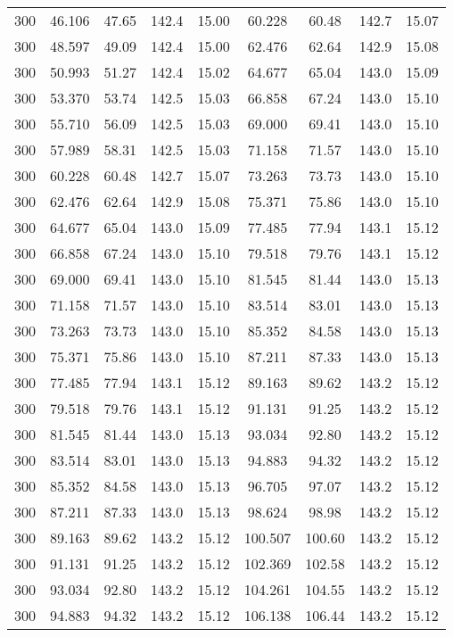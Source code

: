\documentclass[captions=tableheading]{scrartcl}
\begin{document}
\begin{table}
\begin{tabular}{c c c c c c c c c}
    300 &  46.106 &  47.65 & 142.4 & 15.00 &   60.228 &  60.48 & 142.7 & 15.07 \\
    300 &  48.597 &  49.09 & 142.4 & 15.00 &   62.476 &  62.64 & 142.9 & 15.08 \\
    300 &  50.993 &  51.27 & 142.4 & 15.02 &   64.677 &  65.04 & 143.0 & 15.09 \\
    300 &  53.370 &  53.74 & 142.5 & 15.03 &   66.858 &  67.24 & 143.0 & 15.10 \\
    300 &  55.710 &  56.09 & 142.5 & 15.03 &   69.000 &  69.41 & 143.0 & 15.10 \\
    300 &  57.989 &  58.31 & 142.5 & 15.03 &   71.158 &  71.57 & 143.0 & 15.10 \\
    300 &  60.228 &  60.48 & 142.7 & 15.07 &   73.263 &  73.73 & 143.0 & 15.10 \\
    300 &  62.476 &  62.64 & 142.9 & 15.08 &   75.371 &  75.86 & 143.0 & 15.10 \\
    300 &  64.677 &  65.04 & 143.0 & 15.09 &   77.485 &  77.94 & 143.1 & 15.12 \\
    300 &  66.858 &  67.24 & 143.0 & 15.10 &   79.518 &  79.76 & 143.1 & 15.12 \\
    300 &  69.000 &  69.41 & 143.0 & 15.10 &   81.545 &  81.44 & 143.0 & 15.13 \\
    300 &  71.158 &  71.57 & 143.0 & 15.10 &   83.514 &  83.01 & 143.0 & 15.13 \\
    300 &  73.263 &  73.73 & 143.0 & 15.10 &   85.352 &  84.58 & 143.0 & 15.13 \\
    300 &  75.371 &  75.86 & 143.0 & 15.10 &   87.211 &  87.33 & 143.0 & 15.13 \\
    300 &  77.485 &  77.94 & 143.1 & 15.12 &   89.163 &  89.62 & 143.2 & 15.12 \\
    300 &  79.518 &  79.76 & 143.1 & 15.12 &   91.131 &  91.25 & 143.2 & 15.12 \\
    300 &  81.545 &  81.44 & 143.0 & 15.13 &   93.034 &  92.80 & 143.2 & 15.12 \\
    300 &  83.514 &  83.01 & 143.0 & 15.13 &   94.883 &  94.32 & 143.2 & 15.12 \\
    300 &  85.352 &  84.58 & 143.0 & 15.13 &   96.705 &  97.07 & 143.2 & 15.12 \\
    300 &  87.211 &  87.33 & 143.0 & 15.13 &   98.624 &  98.98 & 143.2 & 15.12 \\
    300 &  89.163 &  89.62 & 143.2 & 15.12 &  100.507 & 100.60 & 143.2 & 15.12 \\
    300 &  91.131 &  91.25 & 143.2 & 15.12 &  102.369 & 102.58 & 143.2 & 15.12 \\
    300 &  93.034 &  92.80 & 143.2 & 15.12 &  104.261 & 104.55 & 143.2 & 15.12 \\
    300 &  94.883 &  94.32 & 143.2 & 15.12 &  106.138 & 106.44 & 143.2 & 15.12 \\



\bottomrule
\end{tabular}

  \end{table}
\end{document}
